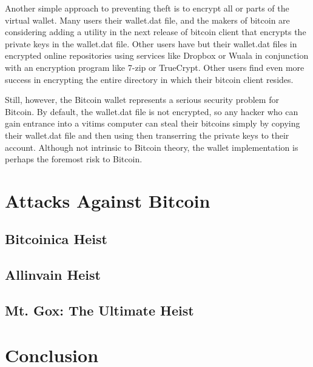 \documentclass{report}
\begin{document}
Another simple approach to preventing theft is to encrypt all or parts of the virtual 
wallet.  Many users their wallet.dat file, and the makers of bitcoin are considering 
adding a utility in the next release of bitcoin client that encrypts the private keys 
in the wallet.dat file.  Other users have but their wallet.dat files in encrypted online 
repositories using services like Dropbox or Wuala in conjunction with an encryption 
program like 7-zip or TrueCrypt.  Other users find even more success in encrypting the 
entire directory in which their bitcoin client resides.

Still, however, the Bitcoin wallet represents a serious security problem for Bitcoin.  
By default, the wallet.dat file is not encrypted, so any hacker who can gain entrance 
into a vitims computer can steal their bitcoins simply by copying their wallet.dat file 
and then using then transerring the private keys to their account.  Although not intrinsic 
to Bitcoin theory, the wallet implementation is perhaps the foremost risk to Bitcoin.

\section*{Attacks Against Bitcoin}

\subsection*{Bitcoinica Heist}
\subsection*{Allinvain Heist}
\subsection*{Mt. Gox: The Ultimate Heist}

\section*{Conclusion}

{}

\end{document}
